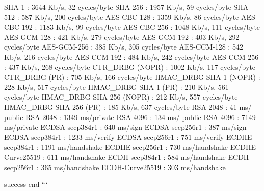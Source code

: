 \begin{DoxyVerb}  SHA-1                    :       3644 Kb/s,         32 cycles/byte
  SHA-256                  :       1957 Kb/s,         59 cycles/byte
  SHA-512                  :        587 Kb/s,        200 cycles/byte
  AES-CBC-128              :       1359 Kb/s,         86 cycles/byte
  AES-CBC-192              :       1183 Kb/s,         99 cycles/byte
  AES-CBC-256              :       1048 Kb/s,        111 cycles/byte
  AES-GCM-128              :        421 Kb/s,        279 cycles/byte
  AES-GCM-192              :        403 Kb/s,        292 cycles/byte
  AES-GCM-256              :        385 Kb/s,        305 cycles/byte
  AES-CCM-128              :        542 Kb/s,        216 cycles/byte
  AES-CCM-192              :        484 Kb/s,        242 cycles/byte
  AES-CCM-256              :        437 Kb/s,        268 cycles/byte
  CTR_DRBG (NOPR)          :       1002 Kb/s,        117 cycles/byte
  CTR_DRBG (PR)            :        705 Kb/s,        166 cycles/byte
  HMAC_DRBG SHA-1 (NOPR)   :        228 Kb/s,        517 cycles/byte
  HMAC_DRBG SHA-1 (PR)     :        210 Kb/s,        561 cycles/byte
  HMAC_DRBG SHA-256 (NOPR) :        212 Kb/s,        557 cycles/byte
  HMAC_DRBG SHA-256 (PR)   :        185 Kb/s,        637 cycles/byte
  RSA-2048                 :      41 ms/ public
  RSA-2048                 :    1349 ms/private
  RSA-4096                 :     134 ms/ public
  RSA-4096                 :    7149 ms/private
  ECDSA-secp384r1          :     640 ms/sign
  ECDSA-secp256r1          :     387 ms/sign
  ECDSA-secp384r1          :    1233 ms/verify
  ECDSA-secp256r1          :     751 ms/verify
  ECDHE-secp384r1          :    1191 ms/handshake
  ECDHE-secp256r1          :     730 ms/handshake
  ECDHE-Curve25519         :     611 ms/handshake
  ECDH-secp384r1           :     584 ms/handshake
  ECDH-secp256r1           :     365 ms/handshake
  ECDH-Curve25519          :     303 ms/handshake

{{success}}
{{end}}
```\end{DoxyVerb}
 